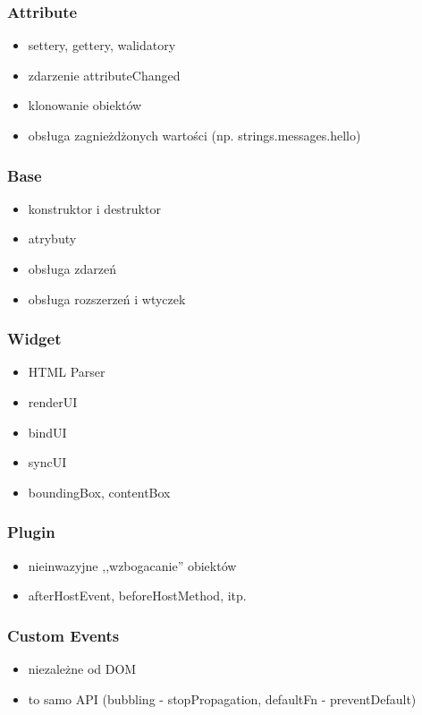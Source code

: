 \documentclass[16pt]{beamer}
\begin{document}
\begin{frame}
  \frametitle{Attribute}
  \begin{itemize}
  \item settery, gettery, walidatory
  \item zdarzenie attributeChanged
  \item klonowanie obiektów
  \item obsługa zagnieżdżonych wartości (np. strings.messages.hello)
  \end{itemize}
\end{frame}

\begin{frame}
  \frametitle{Base}
  \begin{itemize}
  \item konstruktor i destruktor
  \item atrybuty
  \item obsługa zdarzeń
  \item obsługa rozszerzeń i wtyczek
  \end{itemize}
\end{frame}

\begin{frame}
  \frametitle{Widget}
  \begin{itemize}
  \item HTML Parser
  \item renderUI
  \item bindUI
  \item syncUI
  \item boundingBox, contentBox
  \end{itemize}
\end{frame}

\begin{frame}
  \frametitle{Plugin}
  \begin{itemize}
  \item nieinwazyjne ,,wzbogacanie'' obiektów
  \item afterHostEvent, beforeHostMethod, itp.
  \end{itemize}
\end{frame}

\begin{frame}
  \frametitle{Custom Events}
  \begin{itemize}
  \item niezależne od DOM
  \item to samo API (bubbling - stopPropagation, defaultFn - preventDefault)
  \end{itemize}
\end{frame}
\end{document}

